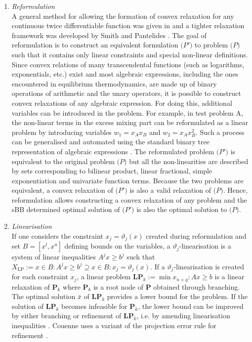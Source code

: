 \begin{enumerate}
	\item \emph{Reformulation}\\
		A general method for allowing the formation of convex relaxation for any continuous twice differentiable function was given in \cite{Androulakis:1995aa,Adjiman:1996aa,Adjiman:1997aa} and a tighter relaxation framework was developed by Smith and Pantelides \cite{Smith:1999aa}. The goal of reformulation is to construct an equivalent formulation $\mathbf(P')$ to problem $\mathbf(P)$ such that it contains only linear constraints and special non-linear definitions. Since convex relations of many transcendental functions (such as logarithms, exponentials, etc.) exist and most algebraic expressions, including the ones encountered in equilibrium thermodynamics, are made up of binary operations of arithmetic and the unary operators, it is possible to construct convex relaxations of any algebraic expression. For doing this, additional variables can be introduced in the problem. For example, in test problem A, the non-linear terms in the excess mixing part can be reformulated as a linear problem by introducing variables $w_1 = x_A x_B$ and $w_2 = x_A x_B^2$. Such a process can be generalised and automated using the standard binary tree representation of algebraic expressions \cite{Smith:1996aa}. The reformulated problem $\mathbf(P')$ is equivalent to the original problem $\mathbf(P)$ but all the non-linearities are described by sets corresponding to bilinear product, linear fractional, simple exponentiation and univariate function terms. Because the two problems are equivalent, a convex relaxation of $\mathbf(P')$ is also a valid relaxation of $\mathbf(P)$. Hence, reformulation allows constructing a convex relaxation of any problem and the sBB determined optimal solution of $\mathbf(P')$ is also the optimal solution to $\mathbf(P)$.
	
	\item \emph{Linearisation}\\
		If one considers the constraint $x_j = \vartheta_j(x)$ created during reformulation and set $B = [x^l, x^u]$ defining bounds on the variables, a $\vartheta_j$-linearisation is a system of linear inequalities $A^j x \geq b^j$ such that $X_\text{LP} := {x \in B : A^j x \geq b^j} \supseteq {x \in B : x_j = \vartheta_j(x)}$. If a $\vartheta_j$-linearisation is created for each constraint $x_j$, a linear problem $\mathbf{LP}_k := \min{x_{n+q} : Ax \geq b}$ is a linear relaxation of $\mathbf{P}_k$ where $\mathbf{P}_k$ is a root node of $\mathbf{P}$ obtained through branching. The optimal solution $\bar{x}$ of $\mathbf{LP}_k$ provides a lower bound for the problem. If the solution of $\mathbf{LP}_k$ becomes infeasible for $\mathbf{P}_k$, the lower bound can be improved by either branching or refinement of $\mathbf{LP}_k$, i.e. by amending linearisation inequalities \cite{Belotti:2009aa}. Couenne uses a variant of the projection error rule for refinement \cite{Belotti:2009aa}.
		

\end{enumerate}
